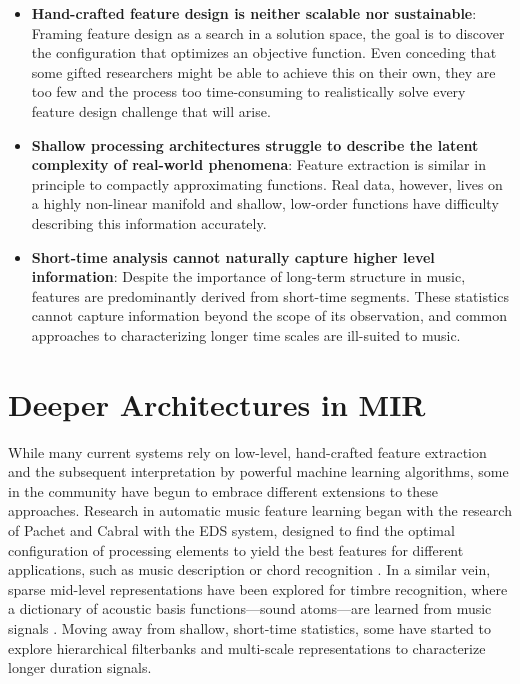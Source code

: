 \begin{itemize}

\item \textbf{Hand-crafted feature design is neither scalable nor sustainable}: Framing feature design as a search in a solution space, the goal is to discover the configuration that optimizes an objective function. Even conceding that some gifted researchers might be able to achieve this on their own, they are too few and the process too time-consuming to realistically solve every feature design challenge that will arise. \\
\item \textbf{Shallow processing architectures struggle to describe the latent complexity of real-world phenomena}: Feature extraction is similar in principle to compactly approximating functions. Real data, however, lives on a highly non-linear manifold and shallow, low-order functions have difficulty describing this information accurately. \\
\item \textbf{Short-time analysis cannot naturally capture higher level information}: Despite the importance of long-term structure in music, features are predominantly derived from short-time segments. These statistics cannot capture information beyond the scope of its observation, and common approaches to characterizing longer time scales are ill-suited to music.\\

\end{itemize}


\section{Deeper Architectures in MIR}
While many current systems rely on low-level, hand-crafted feature extraction and the subsequent interpretation by powerful machine learning algorithms, some in the community have begun to embrace different extensions to these approaches.
Research in automatic music feature learning began with the research of Pachet and Cabral with the EDS system, designed to find the optimal configuration of processing elements to yield the best features for different applications, such as music description or chord recognition \cite{Pachet2003, Pachet2006}.
In a similar vein, sparse mid-level representations have been explored for timbre recognition, where a dictionary of acoustic basis functions---sound atoms---are learned from music signals \cite{Richard2006}.
Moving away from shallow, short-time statistics, some have started to explore hierarchical filterbanks \cite{Anden2011} and multi-scale representations \cite{Hamel2011, Hamel2012} to characterize longer duration signals.

